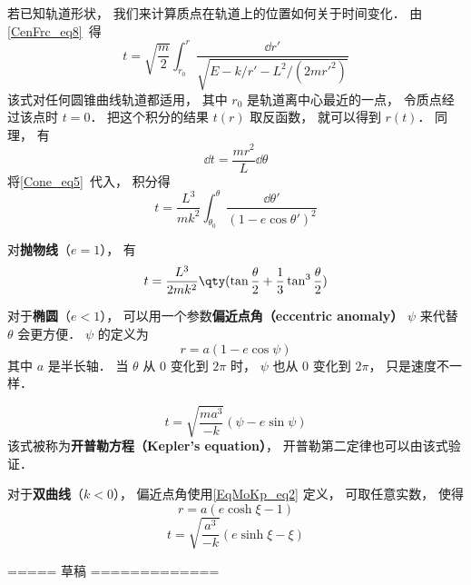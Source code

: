 

若已知轨道形状， 我们来计算质点在轨道上的位置如何关于时间变化． 由\autoref{CenFrc_eq8}~得
\begin{equation}
t = \sqrt{\frac{m}{2}} \int_{r_0}^r \frac{\dd{r'}}{\sqrt{E - k/r' - L^2/(2mr'^2)}}
\end{equation}
该式对任何圆锥曲线轨道都适用， 其中 $r_0$ 是轨道离中心最近的一点， 令质点经过该点时 $t= 0$． 把这个积分的结果 $t(r)$ 取反函数， 就可以得到 $r(t)$． 同理， 有
\begin{equation}
\dd{t} = \frac{mr^2}{L}\dd{\theta}
\end{equation}
将\autoref{Cone_eq5}~代入， 积分得
\begin{equation}
t = \frac{L^3}{mk^2} \int_{\theta_0}^\theta \frac{\dd{\theta'}}{(1 - e\cos \theta')^2 }
\end{equation}

对\textbf{抛物线}（$e = 1$）， 有
\begin{equation}
t = \frac{L^3}{2mk^2} \qty(\tan\frac{\theta}{2} +  \frac{1}{3}\tan^3 \frac{\theta}{2})
\end{equation}

对于\textbf{椭圆}（$e < 1$）， 可以用一个参数\textbf{偏近点角（eccentric anomaly）} $\psi$ 来代替 $\theta$ 会更方便． $\psi$ 的定义为
\begin{equation}\label{EqMoKp_eq1}
r = a(1-e\cos\psi)
\end{equation}
其中 $a$ 是半长轴． 当 $\theta$ 从 $0$ 变化到 $2\pi$ 时， $\psi$ 也从 $0$ 变化到 $2\pi$， 只是速度不一样．

\begin{equation}
t = \sqrt{\frac{ma^3}{-k}} (\psi - e \sin\psi)
\end{equation}
该式被称为\textbf{开普勒方程（Kepler's equation）}， 开普勒第二定律也可以由该式验证．

对于\textbf{双曲线}（$k<0$）， 偏近点角使用\autoref{EqMoKp_eq2} 定义， 可取任意实数， 使得
\begin{equation}\label{EqMoKp_eq2}
r = a(e\cosh\xi - 1)
\end{equation}
\begin{equation}
t = \sqrt{\frac{a^3}{-k}} (e\sinh\xi - \xi)
\end{equation}

===== 草稿  =============

